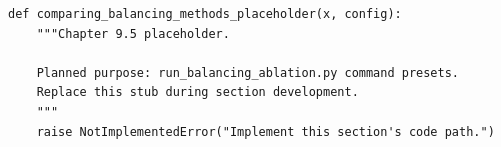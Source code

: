 \begin{lstlisting}[style=bookpython,caption={Planned code placeholder for comparing balancing methods.},label={lst:ch09-comparing-balancing-methods}]
def comparing_balancing_methods_placeholder(x, config):
    """Chapter 9.5 placeholder.

    Planned purpose: run_balancing_ablation.py command presets.
    Replace this stub during section development.
    """
    raise NotImplementedError("Implement this section's code path.")
\end{lstlisting}
